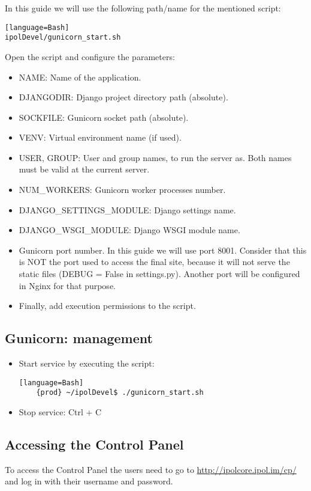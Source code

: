 \documentclass[a4paper,12pt]{article}
\begin{document}
In this guide we will use the following path/name for the mentioned script:
\begin{verbatim}[language=Bash]
ipolDevel/gunicorn_start.sh
\end{verbatim}

Open the script and configure the parameters:
\begin{itemize}
    \item NAME: Name of the application.
    \item DJANGODIR: Django project directory path (absolute).
    \item SOCKFILE: Gunicorn socket path (absolute).
    \item VENV: Virtual environment name (if used).
    \item USER, GROUP: User and group names, to run the server as. Both names must be valid at the current server.
    \item NUM\_WORKERS: Gunicorn worker processes number.
    \item DJANGO\_SETTINGS\_MODULE: Django settings name.
    \item DJANGO\_WSGI\_MODULE: Django WSGI module name.
    \item Gunicorn port number. In this guide we will use port 8001. Consider that this is NOT the port used to access the final site, because it will not serve the static files (DEBUG = False in settings.py). Another port will be configured in Nginx for that purpose.
    \item Finally, add execution permissions to the script.
\end{itemize}

\subsection{Gunicorn: management}
\begin{itemize}
    \item Start service by executing the script:
    \begin{verbatim}[language=Bash]
    {prod} ~/ipolDevel$ ./gunicorn_start.sh
    \end{verbatim}

    \item Stop service: Ctrl + C
\end{itemize}



\subsection{Accessing the Control Panel}
To access the Control Panel the users need to go to \url{http://ipolcore.ipol.im/cp/} and log in with their username and password.
\end{document}

